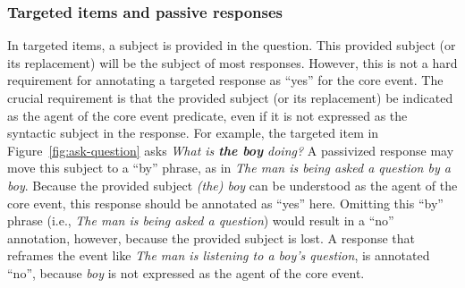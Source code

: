 \documentclass[12pt,notitlepage]{article}
\begin{document}
\subsubsection{Targeted items and passive responses} \label{sec:core-targeted} In targeted items, a subject is provided in the question. This provided subject (or its replacement) will be the subject of most responses. However, this is not a hard requirement for annotating a targeted response as ``yes'' for the core event. The crucial requirement is that the provided subject (or its replacement) be indicated as the agent of the core event predicate, even if it is not expressed as the syntactic subject in the response. For example, the targeted item in Figure~\ref{fig:ask-question} asks \textit{What is \textbf{the boy} doing?} A passivized response may move this subject to a ``by'' phrase, as in \textit{The man is being asked a question by a boy}. Because the provided subject \textit{(the) boy} can be understood as the agent of the core event, this response should be annotated as ``yes'' here. Omitting this ``by'' phrase (i.e., \textit{The man is being asked a question}) would result in a ``no'' annotation, however, because the provided subject is lost. 
A response that reframes the event like \textit{The man is listening to a boy's question}, is annotated ``no'', because \textit{boy} is not expressed as the agent of the core event. 
\end{document}
